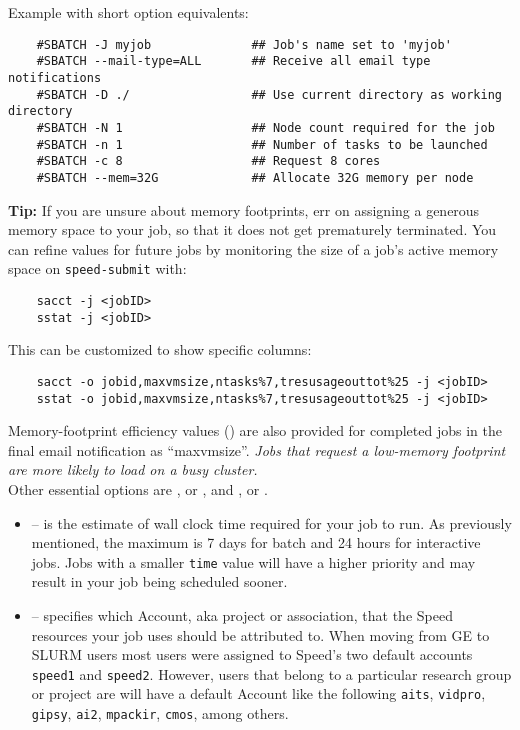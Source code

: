 \noindent Example with short option equivalents:
\small
\begin{verbatim}
    #SBATCH -J myjob              ## Job's name set to 'myjob'
    #SBATCH --mail-type=ALL       ## Receive all email type notifications
    #SBATCH -D ./                 ## Use current directory as working directory
    #SBATCH -N 1                  ## Node count required for the job
    #SBATCH -n 1                  ## Number of tasks to be launched
    #SBATCH -c 8                  ## Request 8 cores
    #SBATCH --mem=32G             ## Allocate 32G memory per node 
\end{verbatim}
\normalsize

\noindent \textbf{Tip:} If you are unsure about memory footprints, err on assigning a generous
memory space to your job, so that it does not get prematurely terminated.
You can refine  values for future jobs by monitoring the size of a job's active
memory space on \texttt{speed-submit} with:

\begin{verbatim}
    sacct -j <jobID>
    sstat -j <jobID>
\end{verbatim}

\noindent This can be customized to show specific columns:

\begin{verbatim}
    sacct -o jobid,maxvmsize,ntasks%7,tresusageouttot%25 -j <jobID>
    sstat -o jobid,maxvmsize,ntasks%7,tresusageouttot%25 -j <jobID>
\end{verbatim}

\noindent Memory-footprint efficiency values () are also provided for completed jobs in the final
email notification as ``maxvmsize''.
\emph{Jobs that request a low-memory footprint are more likely to load on a busy
cluster.}\\

\noindent Other essential options are , or , and , or .
\begin{itemize}
    \item {} -- is the estimate of wall clock time required for your job to run. 
    As previously mentioned, the maximum is 7 days for batch and 24 hours for interactive jobs. 
    Jobs with a smaller \texttt{time} value will have a higher priority and may result in your job being scheduled sooner. 

    \item {} -- specifies which Account, aka project or association, 
    that the Speed resources your job uses should be attributed to. When moving from 
    GE to SLURM users most users were assigned to Speed's two default accounts 
    \texttt{speed1} and \texttt{speed2}. However, users that belong to a particular research
    group or project are will have a default Account like the following
    \texttt{aits},
    \texttt{vidpro},
    \texttt{gipsy},
    \texttt{ai2},
    \texttt{mpackir},
    \texttt{cmos}, among others.
\end{itemize}